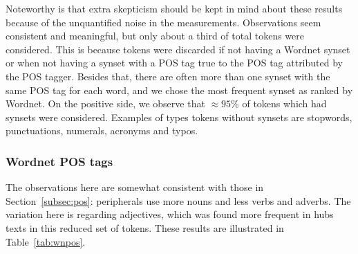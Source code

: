 Noteworthy is that extra skepticism should be kept in mind about these results
because of the unquantified noise in the measurements.
Observations seem consistent and meaningful, but only about a third of total tokens
were considered.
This is because tokens were discarded if not having a Wordnet synset
or when not having a synset with a POS tag true to the POS tag attributed by the POS tagger.
Besides that, there are often more than one synset with the same POS tag for each word,
and we chose the most frequent synset as ranked by Wordnet.
On the positive side, we observe that $\approx 95\%$ of tokens which had synsets
were considered.
Examples of types tokens without synsets are stopwords, punctuations, numerals, acronyms and typos.

\subsubsection{Wordnet POS tags}\label{subsec:wnpos}
The observations here are somewhat consistent with those in Section~\ref{subsec:pos}:
peripherals use more nouns and less verbs and adverbs.
The variation here is regarding adjectives, which was found more frequent in hubs texts
in this reduced set of tokens.
These results are illustrated in Table~\ref{tab:wnpos}.

\FloatBarrier


